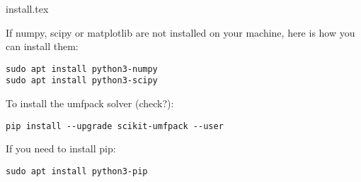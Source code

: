 \begin{flushright} {\tiny {\color{gray} install.tex}} \end{flushright}

If numpy, scipy or matplotlib are not installed on your machine, here is how you 
can install them:
\begin{verbatim}
sudo apt install python3-numpy
sudo apt install python3-scipy
\end{verbatim}
To install the umfpack solver (check?):
\begin{verbatim}
pip install --upgrade scikit-umfpack --user
\end{verbatim}
If you need to install pip:
\begin{verbatim}
sudo apt install python3-pip
\end{verbatim}

